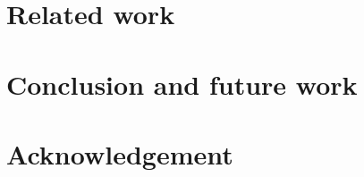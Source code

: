 \documentclass{sig-alternate}
\begin{document}
 
 
 


\section{Related work}
\label{sec:related}

\section{Conclusion and future work}
\label{sec:concfut}

\section{Acknowledgement}

%

%
%
\end{document}
